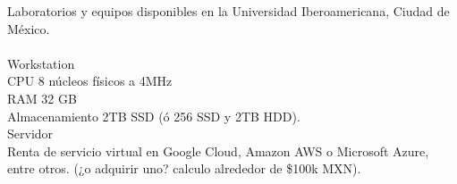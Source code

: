 Laboratorios y equipos disponibles en la Universidad Iberoamericana, Ciudad de México.\\\\

Workstation\\
CPU 8 núcleos físicos a 4MHz\\
RAM 32 GB\\
Almacenamiento 2TB SSD (ó 256 SSD y 2TB HDD).\\

Servidor\\
Renta de servicio virtual en Google Cloud, Amazon AWS o Microsoft Azure, entre otros. (¿o adquirir uno? calculo alrededor de \$100k MXN).